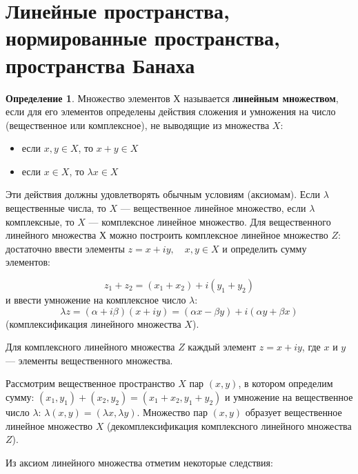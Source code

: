 \documentclass[12pt,a4paper,titlepage, oneside]{book}
\theoremstyle{definition}
\newtheorem*{definition}{Определение}
\theoremstyle{plain}
\theoremstyle{remark}
\theoremstyle{remark}
\theoremstyle{remark}
\theoremstyle{remark}
\theoremstyle{plain}
\theoremstyle{plain}
\begin{document}
\section{Линейные пространства, нормированные пространства, пространства Банаха}

\begin{definition}

Множество элементов $Х$ называется \textbf{линейным множеством}, если для его элементов определены действия сложения и умножения на число (вещественное или комплексное), не выводящие из множества $X$:

\begin{itemize}

	\item если $x,y\in X$, то $x+y\in X$

	\item если $x\in X$, то $\lambda x\in X$

\end{itemize}

\end{definition}


Эти действия должны удовлетворять обычным условиям (аксиомам). Если $\lambda$ вещественные числа, то $X$ --- вещественное линейное множество, если $\lambda$ комплексные, то $X$ --- комплексное линейное множество. Для вещественного линейного множества $Х$ можно построить комплексное линейное множество $Z$: достаточно ввести элементы $z=x+iy,\quad x,y \in X$ и определить сумму элементов:

\begin{equation*}
z_1+z_2=(x_1+x_2)+i(y_1+y_2)
\end{equation*}
и ввести умножение на комплексное число $\lambda$:
\begin{equation*}
\lambda z = (\alpha + i\beta)(x+iy) = (\alpha x - \beta y)+i(\alpha y + \beta x)
\end{equation*}
(комплексификация линейного множества $X$).

Для комплексного линейного множества $Z$ каждый элемент $z=x+iy$, где $x$ и $y$ --- элементы вещественного множества.

Рассмотрим вещественное пространство $X$ пар $(x,y)$, в котором определим сумму: $(x_1,y_1)+(x_2,y_2) = (x_1+x_2,y_1+y_2)$ и умножение на вещественное число $\lambda$: $\lambda(x,y) = (\lambda x, \lambda y)$. Множество пар $(x,y)$ образует вещественное линейное множество  $X$ (декомплексификация комплексного линейного множества $Z$).

Из аксиом линейного множества отметим некоторые следствия:
\end{document}
